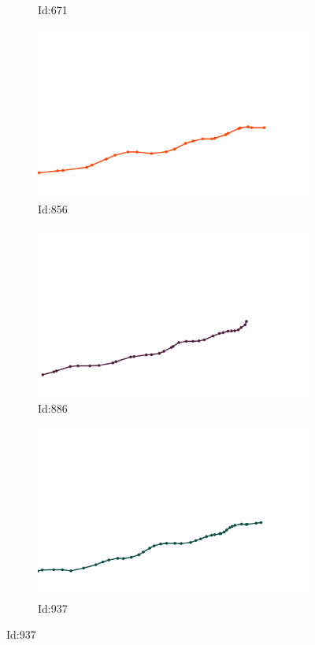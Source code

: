 \documentclass[12pt,twoside]{report}
\begin{document}
\begin{figure}
\begin{subfigure}[b]{0.20\textwidth}
\caption{Id:671}
\end{subfigure}
\begin{subfigure}[b]{0.20\textwidth}
\centering
\includegraphics[width=\textwidth]{../../trajectories/856.png}
\caption{Id:856}
\end{subfigure}
\begin{subfigure}[b]{0.20\textwidth}
\centering
\includegraphics[width=\textwidth]{../../trajectories/886.png}
\caption{Id:886}
\end{subfigure}
\begin{subfigure}[b]{0.20\textwidth}
\centering
\includegraphics[width=\textwidth]{../../trajectories/937.png}
\caption{Id:937}
\end{subfigure}
\end{figure}
\end{document}
